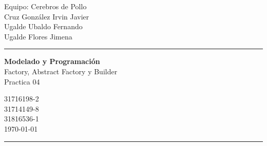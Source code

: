\documentclass[a4paper,10pt]{article}
\begin{document}
\fancyhead[C]{}
\begin{minipage}{0.295\textwidth} 
\raggedright
Equipo: Cerebros de Pollo\\    
\footnotesize 
\colorbox[rgb]{0.67, 0.88, 0.69}{Cruz González Irvin Javier}
\\\colorbox[rgb]{0.06, 0.75, 0.99 }{Ugalde Ubaldo Fernando}
\\\colorbox[rgb]{0.96, 0.76, 0.76}{Ugalde Flores Jimena}

\textcolor[rgb]{0.0, 0.72, 0.92}{\medskip\hrule}
\end{minipage}
\begin{minipage}{0.4\textwidth} 
\centering 
\large 
\textbf{Modelado y Programación}\\ 
\normalsize 
Factory, Abstract Factory y Builder \\Practica 04\\
\end{minipage}
\begin{minipage}{0.295\textwidth} 
\raggedleft
\footnotesize
\colorbox[rgb]{0.67, 0.88, 0.69}{31716198-2}\\
\colorbox[rgb]{0.06, 0.75, 0.99 }{31714149-8}\\
\colorbox[rgb]{0.96, 0.76, 0.76}{31816536-1}\\
\today
\textcolor[rgb]{0.0, 0.72, 0.92}{\medskip\hrule}
\end{minipage}
\end{document}

